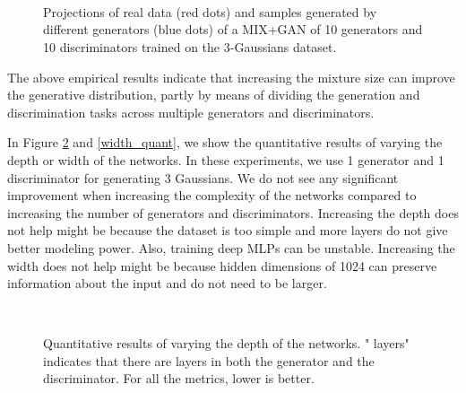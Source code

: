 \documentclass[conference]{IEEEtran}
\begin{document}
\begin{figure}[!h]
	\begin{center}
		\\
		\\
		\\
	\end{center}
	\caption{Projections of real data (red dots) and samples generated by different generators (blue dots) of a MIX+GAN of 10 generators and 10 discriminators trained on the 3-Gaussians dataset.}
	\label{10G10D}
\end{figure}

The above empirical results indicate that increasing the mixture size can improve the generative distribution, partly by means of dividing the generation and discrimination tasks across multiple generators and discriminators.

In Figure \ref{depth_quant} and \ref{width_quant}, we show the quantitative results of varying the depth or width of the networks. In these experiments, we use 1 generator and 1 discriminator for generating 3 Gaussians. We do not see any significant improvement when increasing the complexity of the networks compared to increasing the number of generators and discriminators. Increasing the depth does not help might be because the dataset is too simple and more layers do not give better modeling power. Also, training deep MLPs can be unstable. Increasing the width does not help might be because hidden dimensions of 1024 can preserve information about the input and do not need to be larger.
\begin{figure}[!h]
	\begin{center}
		\\
	\end{center}
	\caption{Quantitative results of varying the depth of the networks. " layers" indicates that there are  layers in both the generator and the discriminator. For all the metrics, lower is better.}
	\label{depth_quant}
\end{figure}
\end{document}
